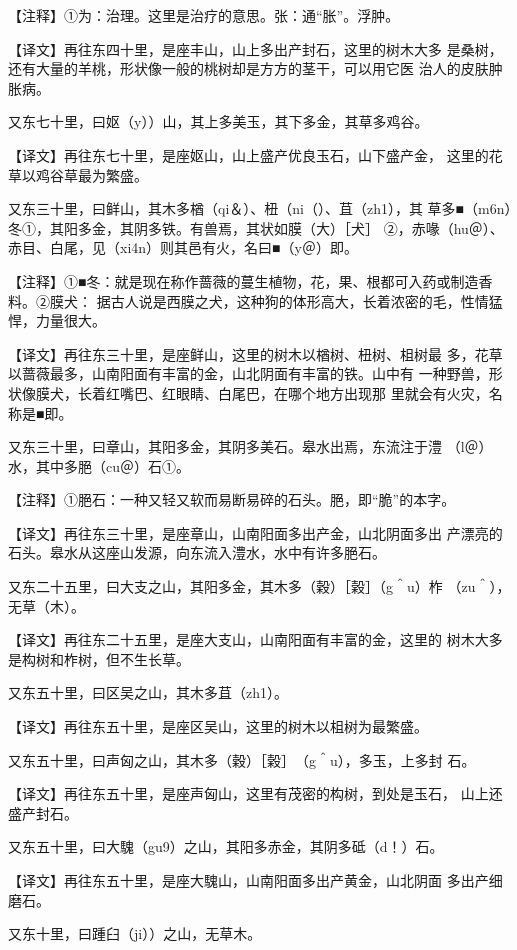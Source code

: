\documentclass[a4paper,12pt,UTF8,twoside]{ctexbook}
\begin{document}
【注释】①为：治理。这里是治疗的意思。张：通“胀”。浮肿。

【译文】再往东四十里，是座丰山，山上多出产封石，这里的树木大多 是桑树，还有大量的羊桃，形状像一般的桃树却是方方的茎干，可以用它医 治人的皮肤肿胀病。

又东七十里，曰妪（y））山，其上多美玉，其下多金，其草多鸡谷。

【译文】再往东七十里，是座妪山，山上盛产优良玉石，山下盛产金， 这里的花草以鸡谷草最为繁盛。

又东三十里，曰鲜山，其木多楢（qi＆）、杻（ni（）、苴（zh1），其 草多■（m6n）冬①，其阳多金，其阴多铁。有兽焉，其状如膜（大）［犬］ ②，赤喙（hu＠）、赤目、白尾，见（xi4n）则其邑有火，名曰■（y＠）即。

【注释】①■冬：就是现在称作蔷薇的蔓生植物，花，果、根都可入药或制造香料。②膜犬： 据古人说是西膜之犬，这种狗的体形高大，长着浓密的毛，性情猛悍，力量很大。

【译文】再往东三十里，是座鲜山，这里的树木以楢树、杻树、柤树最 多，花草以蔷薇最多，山南阳面有丰富的金，山北阴面有丰富的铁。山中有 一种野兽，形状像膜犬，长着红嘴巴、红眼睛、白尾巴，在哪个地方出现那 里就会有火灾，名称是■即。

又东三十里，曰章山，其阳多金，其阴多美石。皋水出焉，东流注于澧 （l＠）水，其中多脃（cu＠）石①。

【注释】①脃石：一种又轻又软而易断易碎的石头。脃，即“脆”的本字。

【译文】再往东三十里，是座章山，山南阳面多出产金，山北阴面多出 产漂亮的石头。皋水从这座山发源，向东流入澧水，水中有许多脃石。

又东二十五里，曰大支之山，其阳多金，其木多（穀）［榖］（g＾u）柞 （zu＾），无草（木）。

【译文】再往东二十五里，是座大支山，山南阳面有丰富的金，这里的 树木大多是构树和柞树，但不生长草。

又东五十里，曰区吴之山，其木多苴（zh1）。

【译文】再往东五十里，是座区吴山，这里的树木以柤树为最繁盛。

又东五十里，曰声匈之山，其木多（穀）［榖］　（g＾u），多玉，上多封 石。

【译文】再往东五十里，是座声匈山，这里有茂密的构树，到处是玉石， 山上还盛产封石。

又东五十里，曰大騩（gu9）之山，其阳多赤金，其阴多砥（d！）石。

【译文】再往东五十里，是座大騩山，山南阳面多出产黄金，山北阴面 多出产细磨石。

又东十里，曰踵臼（ji））之山，无草木。
\end{document}

